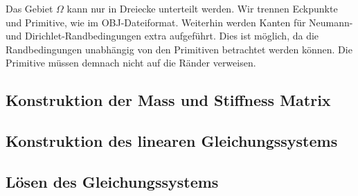 \documentclass[crop=false,10pt,ngerman]{standalone}
\begin{document}
      Das Gebiet $\Omega$ kann nur in Dreiecke unterteilt werden.
      Wir trennen Eckpunkte und Primitive, wie im OBJ-Dateiformat.
      Weiterhin werden Kanten für Neumann- und Dirichlet-Randbedingungen extra aufgeführt.
      Dies ist möglich, da die Randbedingungen unabhängig von den Primitiven betrachtet werden können.
      Die Primitive müssen demnach nicht auf die Ränder verweisen.
      \cite{Alberty1998}

    \subsection{Konstruktion der Mass und Stiffness Matrix} %
    \label{sub:konstruktion_der_mass_und_stiffness_matrix}











    \subsection{Konstruktion des linearen Gleichungssystems} %
    \label{sub:konstruktion_des_linearen_gleichungssystems}


    \subsection{Lösen des Gleichungssystems} %
    \label{sub:lösen_des_gleichungssystems}
\end{document}
